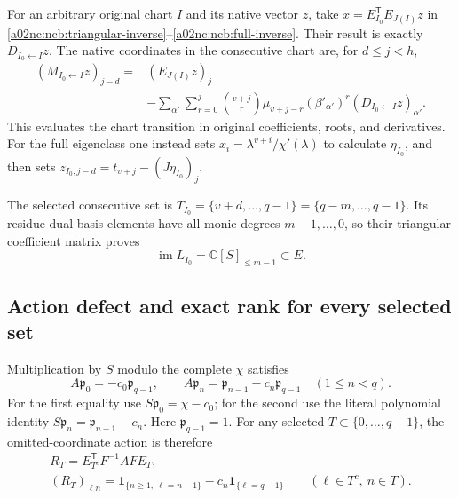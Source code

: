 For an arbitrary original chart $I$ and its native vector $z$, take
$x=E_{I_0}^{\mathsf T}E_{J(I)}z$ in
\eqref{a02nc:ncb:triangular-inverse}--\eqref{a02nc:ncb:full-inverse}. Their result
is exactly $D_{I_0\leftarrow I}z$. The native coordinates in the
consecutive chart are, for $d\leq j<h$,
\begin{equation}\tag{NCB28}\label{a02nc:ncb:explicit-transition}
\begin{split}
(M_{I_0\leftarrow I}z)_{j-d}
={}&(E_{J(I)}z)_j\\
&-\sum_{\alpha'}\sum_{r=0}^{j}
\binom{v+j}{r}\mu_{v+j-r}(\beta'_{\alpha'})^r
                    (D_{I_0\leftarrow I}z)_{\alpha'} .
\end{split}
\end{equation}
This evaluates the chart transition in original coefficients, roots,
and derivatives. For the full eigenclass one instead sets
$x_i=\lambda^{v+i}/\chi'(\lambda)$ to calculate $\eta_{I_0}$,
and then sets
$z_{I_0,j-d}=t_{v+j}-(J\eta_{I_0})_j$.

The selected consecutive set is
$T_{I_0}=\{v+d,\ldots,q-1\}=\{q-m,\ldots,q-1\}$.
Its residue-dual basis elements have all monic degrees
$m-1,\ldots,0$, so their triangular coefficient matrix proves
\begin{equation}\tag{NCB29}\label{a02nc:ncb:consecutive-image}
\operatorname{im}L_{I_0}=\mathbb C[S]_{\leq m-1}\subset E .
\end{equation}

\subsection{Action defect and exact rank for every selected set}
Multiplication by $S$ modulo the complete $\chi$ satisfies
\begin{equation}\tag{NCB30}\label{a02nc:ncb:action}
A\mathfrak p_0=-c_0\mathfrak p_{q-1},\qquad
A\mathfrak p_n=\mathfrak p_{n-1}-c_n\mathfrak p_{q-1}
\quad(1\leq n<q).
\end{equation}
For the first equality use $S\mathfrak p_0=\chi-c_0$;
for the second use the literal polynomial identity
$S\mathfrak p_n=\mathfrak p_{n-1}-c_n$.
Here $\mathfrak p_{q-1}=1$.
For any selected $T\subset\{0,\ldots,q-1\}$, the omitted-coordinate
action is therefore
\begin{equation}\tag{NCB31}\label{a02nc:ncb:RT}
\begin{gathered}
R_T=E_{T^c}^{\mathsf T}F^{-1}AFE_T,\\
(R_T)_{\ell n}
=\mathbf1_{\{n\geq1,\ \ell=n-1\}}
       -c_n\mathbf1_{\{\ell=q-1\}}
\qquad(\ell\in T^c,\ n\in T).
\end{gathered}
\end{equation}

